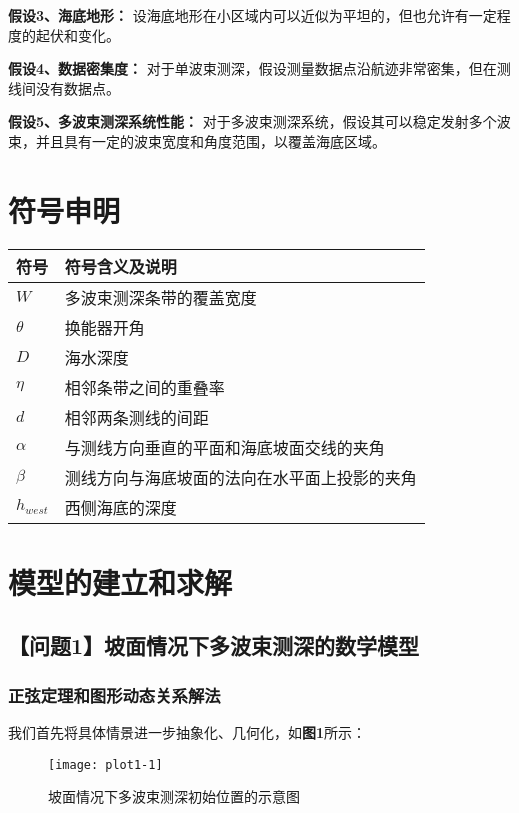 \documentclass{cumcmthesis}
\begin{document}
\textbf{假设3、海底地形：} 设海底地形在小区域内可以近似为平坦的，但也允许有一定程度的起伏和变化。

\textbf{假设4、数据密集度：} 对于单波束测深，假设测量数据点沿航迹非常密集，但在测线间没有数据点。

\textbf{假设5、多波束测深系统性能：} 对于多波束测深系统，假设其可以稳定发射多个波束，并且具有一定的波束宽度和角度范围，以覆盖海底区域。

\section{符号申明}
\begin{table}[ht]
    \centering
    \begin{tabular}{ll}
    \toprule
    符号 & 符号含义及说明 \\
    \midrule
    $W$ & 多波束测深条带的覆盖宽度 \\
    $\theta$ & 换能器开角 \\
    $D$ & 海水深度 \\
    $\eta$ & 相邻条带之间的重叠率 \\
    $d$ & 相邻两条测线的间距 \\
    $\alpha$ & 与测线方向垂直的平面和海底坡面交线的夹角 \\
    $\beta$ & 测线方向与海底坡面的法向在水平面上投影的夹角 \\
    $h_{west}$ & 西侧海底的深度 \\
    \bottomrule
    \end{tabular}
    \end{table}

\section{模型的建立和求解}
\subsection{【问题1】坡面情况下多波束测深的数学模型}
\subsubsection{正弦定理和图形动态关系解法}
我们首先将具体情景进一步抽象化、几何化，如\textbf{图1}所示：
\begin{figure}[!h]
    \centering
    \texttt{[image: plot1-1]}
    \caption{坡面情况下多波束测深初始位置的示意图}
    \label{fig:plot1-1}
\end{figure}
\end{document}
